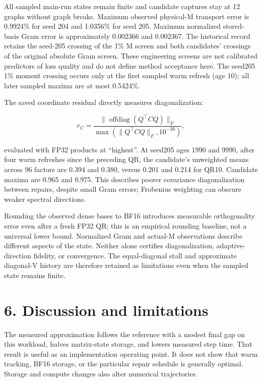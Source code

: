 \documentclass[
  10pt,
]{article}
\begin{document}
All sampled main-run states remain finite and candidate captures stay at
12 graphs without graph breaks. Maximum observed physical-M transport
error is 0.9924\% for seed 204 and 1.0356\% for seed 205. Maximum
normalized stored-basis Gram error is approximately 0.002366 and
0.002367. The historical record retains the seed-205 crossing of the 1\%
M screen and both candidates' crossings of the original absolute Gram
screen. These engineering screens are not calibrated predictors of loss
quality and do not define method acceptance here. The seed205 1\% moment
crossing occurs only at the first sampled warm refresh (age 10); all
later sampled maxima are at most 0.5424\%.

The saved coordinate residual directly measures diagonalization:

\[
r_C=\frac{\|\operatorname{offdiag}(Q^\top C Q)\|_F}
{\max(\|Q^\top C Q\|_F,10^{-30})},
\]

evaluated with FP32 products at ``highest''. At seed205 ages 1990 and
9990, after four warm refreshes since the preceding QR, the candidate's
unweighted means across 96 factors are 0.394 and 0.380, versus 0.201 and
0.214 for QR10. Candidate maxima are 0.965 and 0.975. This describes
poorer covariance diagonalization between repairs, despite small Gram
errors; Frobenius weighting can obscure weaker spectral directions.

Rounding the observed dense bases to BF16 introduces measurable
orthogonality error even after a fresh FP32 QR; this is an empirical
rounding baseline, not a universal lower bound. Normalized Gram and
actual-M observations describe different aspects of the state. Neither
alone certifies diagonalization, adaptive-direction fidelity, or
convergence. The equal-diagonal stall and approximate diagonal-V history
are therefore retained as limitations even when the sampled state
remains finite.

\hypertarget{discussion-and-limitations}{%
\section{6. Discussion and
limitations}\label{discussion-and-limitations}}

The measured approximation follows the reference with a modest final gap
on this workload, halves matrix-state storage, and lowers measured step
time. That result is useful as an implementation operating point. It
does not show that warm tracking, BF16 storage, or the particular repair
schedule is generally optimal. Storage and compute changes also alter
numerical trajectories.
\end{document}
